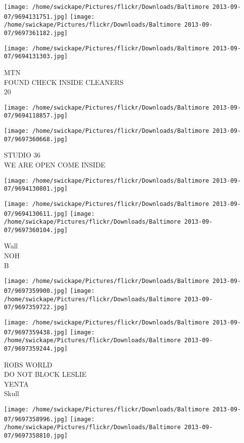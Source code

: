 \documentclass[10pt,letterpaper]{article}
\begin{document}
\texttt{[image: /home/swickape/Pictures/flickr/Downloads/Baltimore 2013-09-07/9694131751.jpg]}
\texttt{[image: /home/swickape/Pictures/flickr/Downloads/Baltimore 2013-09-07/9697361182.jpg]}

\texttt{[image: /home/swickape/Pictures/flickr/Downloads/Baltimore 2013-09-07/9694131303.jpg]}

MTN\\
FOUND CHECK INSIDE CLEANERS\\
20
\pagebreak

\texttt{[image: /home/swickape/Pictures/flickr/Downloads/Baltimore 2013-09-07/9694118857.jpg]}

\vspace{0.25in}
\texttt{[image: /home/swickape/Pictures/flickr/Downloads/Baltimore 2013-09-07/9697360668.jpg]}

STUDIO 36\\
WE ARE OPEN COME INSIDE
\pagebreak

\texttt{[image: /home/swickape/Pictures/flickr/Downloads/Baltimore 2013-09-07/9694130801.jpg]}

\vspace{0.25in}
\texttt{[image: /home/swickape/Pictures/flickr/Downloads/Baltimore 2013-09-07/9694130611.jpg]}
\texttt{[image: /home/swickape/Pictures/flickr/Downloads/Baltimore 2013-09-07/9697360104.jpg]}

Wall\\
NOH\\
B
\pagebreak

\texttt{[image: /home/swickape/Pictures/flickr/Downloads/Baltimore 2013-09-07/9697359900.jpg]}
\texttt{[image: /home/swickape/Pictures/flickr/Downloads/Baltimore 2013-09-07/9697359722.jpg]}

\texttt{[image: /home/swickape/Pictures/flickr/Downloads/Baltimore 2013-09-07/9697359438.jpg]}
\texttt{[image: /home/swickape/Pictures/flickr/Downloads/Baltimore 2013-09-07/9697359244.jpg]}

ROBS WORLD\\
DO NOT BLOCK LESLIE\\
YENTA\\
Skull
\pagebreak

\texttt{[image: /home/swickape/Pictures/flickr/Downloads/Baltimore 2013-09-07/9697358996.jpg]}
\texttt{[image: /home/swickape/Pictures/flickr/Downloads/Baltimore 2013-09-07/9697358810.jpg]}
\end{document}
